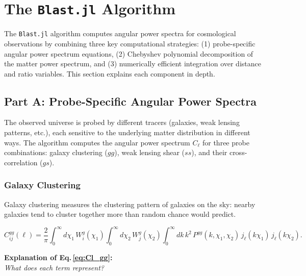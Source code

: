 
\section{The \texttt{Blast.jl} Algorithm}

The \texttt{Blast.jl} algorithm computes angular power spectra for cosmological observations by combining three key computational strategies: (1) probe-specific angular power spectrum equations, (2) Chebyshev polynomial decomposition of the matter power spectrum, and (3) numerically efficient integration over distance and ratio variables. This section explains each component in depth.

\subsection{Part A: Probe-Specific Angular Power Spectra}

The observed universe is probed by different tracers (galaxies, weak lensing patterns, etc.), each sensitive to the underlying matter distribution in different ways. The algorithm computes the angular power spectrum $C_\ell$ for three probe combinations: galaxy clustering ($gg$), weak lensing shear ($ss$), and their cross-correlation ($gs$).

\subsubsection{Galaxy Clustering}

Galaxy clustering measures the clustering pattern of galaxies on the sky: nearby galaxies tend to cluster together more than random chance would predict.

\begin{equation}
    C^{gg}_{ij}(\ell) = \frac{2}{\pi}
    \int_0^\infty d\chi_1\, W^g_i(\chi_1)
    \int_0^\infty d\chi_2\, W^g_j(\chi_2)
    \int_0^\infty dk\, k^2\, P^{gg}(k,\chi_1,\chi_2)\,
    j_\ell(k\chi_1)\,j_\ell(k\chi_2).
    \label{eq:Cl_gg}
\end{equation}

\noindent\textbf{\large Explanation of Eq.\,\eqref{eq:Cl_gg}:}\\
\textit{What does each term represent?}

